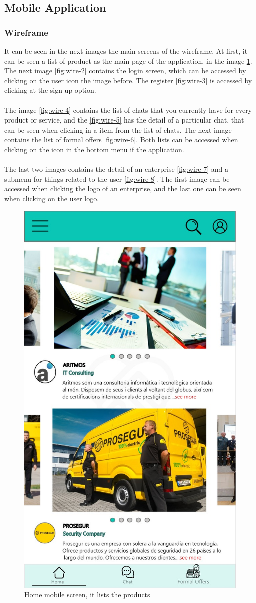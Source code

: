 \documentclass[./main.tex]{subfiles}
\begin{document}
\subsection{Mobile Application}
\subsubsection{Wireframe}
It can be seen in the next images the main screens of the wireframe. At first, it can be seen a list of product
as the main page of the application, in the image \ref{fig:wire-1}. The next image \ref{fig:wire-2} contains the login screen, which can be accessed by clicking on the user icon the image before. The register \ref{fig:wire-3} is accessed by clicking at the sign-up option.\\
\\
The image \ref{fig:wire-4} contains the list of chats that you currently have for every product or service, and the \ref{fig:wire-5} has the detail of a particular chat, that can be seen when clicking in a item from the list of chats. The next image contains the list of formal offers \ref{fig:wire-6}. Both lists can be accessed when clicking on the icon in the bottom menu if the application.\\
\\
The last two images contains the detail of an enterprise \ref{fig:wire-7} and a submenu for things related to the user \ref{fig:wire-8}. The first image can be accessed when clicking the logo of an enterprise, and the last one can be seen when clicking on the user logo. 
\begin{figure}[H]
	\centering
	\includegraphics[width=0.5\linewidth]{img/home-page.jpeg}
	\caption{Home mobile screen, it lists the products}
	\label{fig:wire-1}
\end{figure}
\end{document}
